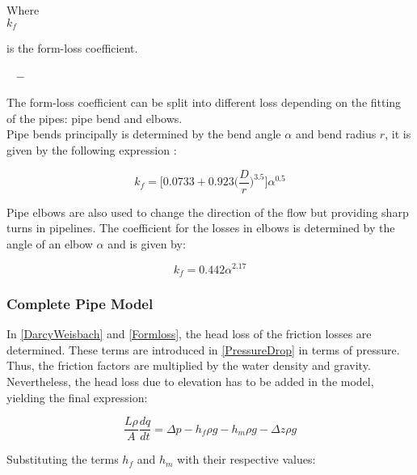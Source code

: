  \begin{minipage}[t]{0.20\textwidth}
Where\\
\hspace*{8mm} $k_f$ 
\end{minipage}
\begin{minipage}[t]{0.68\textwidth}
\vspace*{2mm}
is the form-loss coefficient.  
 \end{minipage}
\begin{minipage}[t]{0.10\textwidth}
\vspace*{2mm}
\textcolor{White}{te}$\unit{-}$
\end{minipage}

The form-loss coefficient can be split into different loss depending on the 
fitting of the pipes: pipe bend and elbows. 
\\
Pipe bends principally is determined by the 
bend angle $\alpha$ and bend radius $r$, it is given by the following 
expression \cite{Design_Water}: 

\begin{equation}
  k_f = \bigg[0.0733 + 0.923 \bigg(\frac{D}{r}\bigg)^{3.5}\bigg]\alpha^{0.5}
\end{equation}

Pipe elbows are also used to change the direction of the flow but providing 
sharp turns in pipelines. The coefficient for the losses in elbows is determined by the angle of an elbow $\alpha$ and is given by:

\begin{equation}
  k_f = 0.442\alpha^{2.17}
\end{equation}

\subsubsection{Complete Pipe Model}
In \eqref{DarcyWeisbach} and \eqref{Formloss}, the head loss of the friction losses are determined. These terms are introduced in \eqref{PressureDrop} in terms of pressure. Thus, the friction factors are multiplied by the water density and gravity. Nevertheless, the head loss due to elevation has to be added in the model, yielding the final expression:

\begin{equation}
   \frac{L \rho}{A} \frac{dq}{dt} =\Delta p - h_f \rho g - h_m \rho g - \Delta z \rho 
   g
\end{equation}

Substituting the terms $h_f$ and $h_m$ with their respective values:

